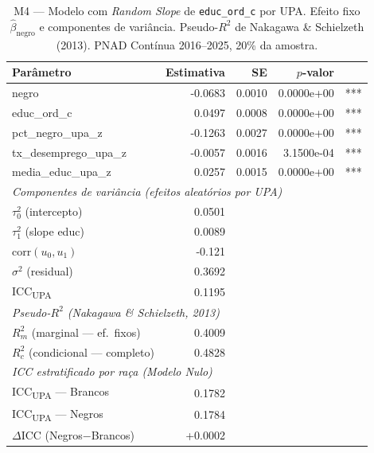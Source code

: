 \begin{table}[H]
\centering
\caption{M4 — Modelo com \textit{Random Slope} de \texttt{educ\_ord\_c} por UPA.
         Efeito fixo $\hat{\beta}_{\text{negro}}$ e componentes de variância.
         Pseudo-$R^2$ de Nakagawa \& Schielzeth (2013).
         PNAD Contínua 2016--2025, 20\% da amostra.}
\label{tab:hlm_m4}
\small
\begin{tabular}{lrrrr}
\toprule
Parâmetro & Estimativa & SE & $p$-valor & \\
\midrule
  negro & -0.0683 & 0.0010 & 0.0000e+00 & *** \\
  educ\_ord\_c & 0.0497 & 0.0008 & 0.0000e+00 & *** \\
  pct\_negro\_upa\_z & -0.1263 & 0.0027 & 0.0000e+00 & *** \\
  tx\_desemprego\_upa\_z & -0.0057 & 0.0016 & 3.1500e-04 & *** \\
  media\_educ\_upa\_z & 0.0257 & 0.0015 & 0.0000e+00 & *** \\
\midrule
\multicolumn{5}{l}{\textit{Componentes de variância (efeitos aleatórios por UPA)}} \\
  $\tau^2_0$ (intercepto) & 0.0501 & & & \\
  $\tau^2_1$ (slope educ) & 0.0089 & & & \\
  $\text{corr}(u_0, u_1)$ & -0.121 & & & \\
  $\sigma^2$ (residual) & 0.3692 & & & \\
  ICC\textsubscript{UPA} & 0.1195 & & & \\
\midrule
\multicolumn{5}{l}{\textit{Pseudo-$R^2$ (Nakagawa \& Schielzeth, 2013)}} \\
  $R^2_m$ (marginal — ef.~fixos) & 0.4009 & & & \\
  $R^2_c$ (condicional — completo) & 0.4828 & & & \\
\midrule
\multicolumn{5}{l}{\textit{ICC estratificado por raça (Modelo Nulo)}} \\
  ICC\textsubscript{UPA} — Brancos & 0.1782 & & & \\
  ICC\textsubscript{UPA} — Negros & 0.1784 & & & \\
  $\Delta$ICC (Negros$-$Brancos) & +0.0002 & & & \\
\bottomrule
\end{tabular}
\end{table}
